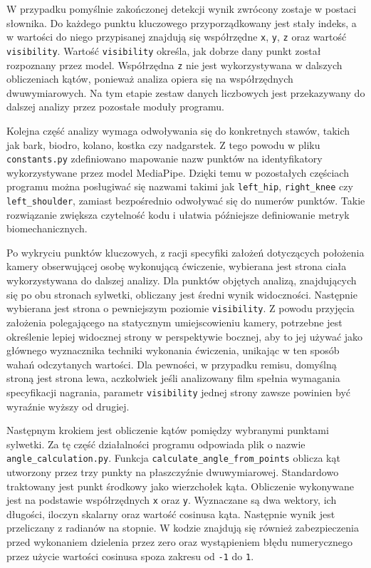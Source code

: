 W przypadku pomyślnie zakończonej detekcji wynik zwrócony zostaje w postaci słownika. Do każdego punktu kluczowego przyporządkowany jest stały indeks, a w wartości do niego przypisanej znajdują się współrzędne \texttt{x}, \texttt{y}, \texttt{z} oraz wartość \texttt{visibility}. Wartość \texttt{visibility} określa, jak dobrze dany punkt został rozpoznany przez model. Współrzędna \texttt{z} nie jest wykorzystywana w dalszych obliczeniach kątów, ponieważ analiza opiera się na współrzędnych dwuwymiarowych. Na tym etapie zestaw danych liczbowych jest przekazywany do dalszej analizy przez pozostałe moduły programu.

Kolejna część analizy wymaga odwoływania się do konkretnych stawów, takich jak bark, biodro, kolano, kostka czy nadgarstek. Z tego powodu w pliku \texttt{constants.py} zdefiniowano mapowanie nazw punktów na identyfikatory wykorzystywane przez model MediaPipe. Dzięki temu w pozostałych częściach programu można posługiwać się nazwami takimi jak \texttt{left\_hip}, \texttt{right\_knee} czy \texttt{left\_shoulder}, zamiast bezpośrednio odwoływać się do numerów punktów. Takie rozwiązanie zwiększa czytelność kodu i ułatwia późniejsze definiowanie metryk biomechanicznych.

Po wykryciu punktów kluczowych, z racji specyfiki założeń dotyczących położenia kamery obserwującej osobę wykonującą ćwiczenie, wybierana jest strona ciała wykorzystywana do dalszej analizy. Dla punktów objętych analizą, znajdujących się po obu stronach sylwetki, obliczany jest średni wynik widoczności. Następnie wybierana jest strona o pewniejszym poziomie \texttt{visibility}. Z powodu przyjęcia założenia polegającego na statycznym umiejscowieniu kamery, potrzebne jest określenie lepiej widocznej strony w perspektywie bocznej, aby to jej używać jako głównego wyznacznika techniki wykonania ćwiczenia, unikając w ten sposób wahań odczytanych wartości. Dla pewności, w przypadku remisu, domyślną stroną jest strona lewa, aczkolwiek jeśli analizowany film spełnia wymagania specyfikacji nagrania, parametr \texttt{visibility} jednej strony zawsze powinien być wyraźnie wyższy od drugiej.

Następnym krokiem jest obliczenie kątów pomiędzy wybranymi punktami sylwetki. Za tę część działalności programu odpowiada plik o nazwie \texttt{angle\_calculation.py}. Funkcja \texttt{calculate\_angle\_from\_points} oblicza kąt utworzony przez trzy punkty na płaszczyźnie dwuwymiarowej. Standardowo traktowany jest punkt środkowy jako wierzchołek kąta. Obliczenie wykonywane jest na podstawie współrzędnych \texttt{x} oraz \texttt{y}. Wyznaczane są dwa wektory, ich długości, iloczyn skalarny oraz wartość cosinusa kąta. Następnie wynik jest przeliczany z radianów na stopnie. W kodzie znajdują się również zabezpieczenia przed wykonaniem dzielenia przez zero oraz wystąpieniem błędu numerycznego przez użycie wartości cosinusa spoza zakresu od \texttt{-1} do \texttt{1}.

